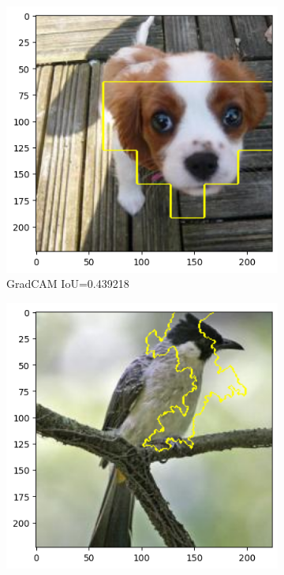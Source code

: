 \begin{figure}[h]
	\centering
	\begin{subfigure}[b]{0.3\textwidth}
		\includegraphics[width=.9\textwidth]{img/examples/appendix/n02086646_12074_gradcam}
		\caption{GradCAM IoU=0.439218}
	\end{subfigure}
	\begin{subfigure}[b]{0.3\textwidth}
		\includegraphics[width=.9\textwidth]{img/examples/appendix/n01560419_47474_lime}

\end{subfigure}
\end{figure}
